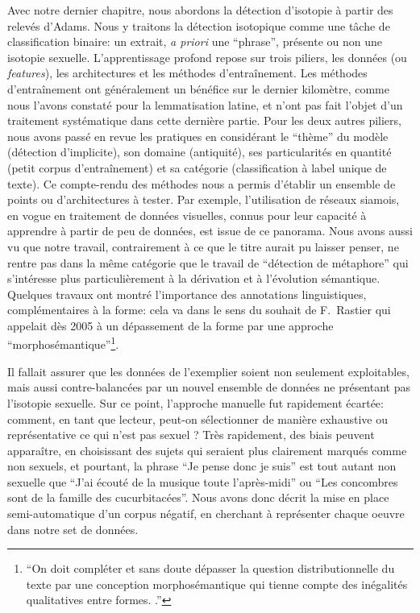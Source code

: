Avec notre dernier chapitre, nous abordons la détection d'isotopie à partir des relevés d'Adams. Nous y traitons la détection isotopique comme une tâche de classification binaire: un extrait, \textit{a priori} une \enquote{phrase}, présente ou non une isotopie sexuelle. L'apprentissage profond repose sur trois piliers, les données (ou \textit{features}), les architectures et les méthodes d'entraînement. Les méthodes d'entraînement ont généralement un bénéfice sur le dernier kilomètre, comme nous l'avons constaté pour la lemmatisation latine, et n'ont pas fait l'objet d'un traitement systématique dans cette dernière partie. Pour les deux autres piliers, nous avons passé en revue les pratiques en considérant le \enquote{thème} du modèle (détection d'implicite), son domaine (antiquité), ses particularités en quantité (petit corpus d'entraînement) et sa catégorie (classification à label unique de texte). Ce compte-rendu des méthodes nous a permis d'établir un ensemble de points ou d'architectures à tester. Par exemple, l'utilisation de réseaux siamois, en vogue en traitement de données visuelles, connus pour leur capacité à apprendre à partir de peu de données, est issue de ce panorama. Nous avons aussi vu que notre travail, contrairement à ce que le titre aurait pu laisser penser, ne rentre pas dans la même catégorie que le travail de \enquote{détection de métaphore} qui s'intéresse plus particulièrement à la dérivation et à l'évolution sémantique. Quelques travaux ont montré l'importance des annotations linguistiques, complémentaires à la forme: cela va dans le sens du souhait de F.~Rastier qui appelait dès 2005 à un dépassement de la forme par une approche \enquote{morphosémantique}\footnote{\enquote{On doit compléter et sans doute dépasser la question distributionnelle du texte par une conception morphosémantique qui tienne compte des inégalités qualitatives entre formes. \textcite[p.~100]{rastier2005enjeux}.}}.

Il fallait assurer que les données de l'exemplier soient non seulement exploitables, mais aussi contre-balancées par un nouvel ensemble de données ne présentant pas l'isotopie sexuelle. Sur ce point, l'approche manuelle fut rapidement écartée: comment, en tant que lecteur, peut-on sélectionner de manière exhaustive ou représentative ce qui n'est pas sexuel ? Très rapidement, des biais peuvent apparaître, en choisissant des sujets qui seraient plus clairement marqués comme non sexuels, et pourtant, la phrase \enquote{Je pense donc je suis} est tout autant non sexuelle que \enquote{J'ai écouté de la musique toute l'après-midi} ou \enquote{Les concombres sont de la famille des cucurbitacées}. Nous avons donc décrit la mise en place semi-automatique d'un corpus négatif, en cherchant à représenter chaque oeuvre dans notre set de données. 

